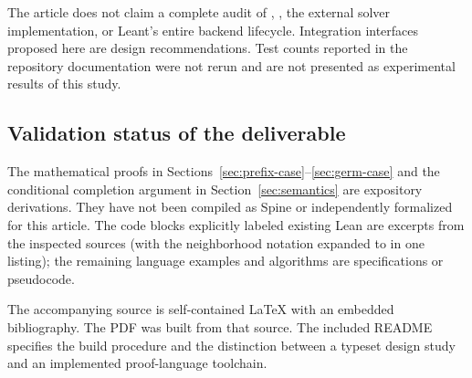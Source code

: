 \documentclass[11pt,letterpaper]{article}
\theoremstyle{definition}
\theoremstyle{remark}
\newcommand{\Spine}{Spine}
\newcommand{\code}[1]{\texttt{\detokenize{#1}}}
\begin{document}
The article does not claim a complete audit of \code{Engine.hs}, \code{Render.hs}, the external solver implementation, or Leant's entire backend lifecycle. Integration interfaces proposed here are design recommendations. Test counts reported in the repository documentation were not rerun and are not presented as experimental results of this study.

\subsection{Validation status of the deliverable}
The mathematical proofs in Sections~\ref{sec:prefix-case}--\ref{sec:germ-case} and the conditional completion argument in Section~\ref{sec:semantics} are expository derivations. They have not been compiled as \Spine{} or independently formalized for this article. The code blocks explicitly labeled existing Lean are excerpts from the inspected sources (with the neighborhood notation expanded to \code{nhds} in one listing); the remaining language examples and algorithms are specifications or pseudocode.

The accompanying source is self-contained LaTeX with an embedded bibliography. The PDF was built from that source. The included README specifies the build procedure and the distinction between a typeset design study and an implemented proof-language toolchain.
\end{document}

